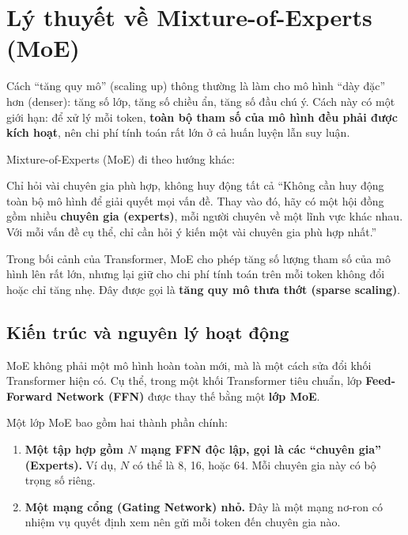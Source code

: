 
\section{Lý thuyết về Mixture-of-Experts (MoE)}
\label{sec:mixture_of_experts}

Cách “tăng quy mô” (scaling up) thông thường là làm cho mô hình “dày đặc” hơn (denser): tăng số lớp, tăng số chiều ẩn, tăng số đầu chú ý. Cách này có một giới hạn: để xử lý mỗi token, \textbf{toàn bộ tham số của mô hình đều phải được kích hoạt}, nên chi phí tính toán rất lớn ở cả huấn luyện lẫn suy luận.

Mixture-of-Experts (MoE) \cite{shazeer2017outrageously, fedus2022switch} đi theo hướng khác:

\begin{keyidea}{Chỉ hỏi vài chuyên gia phù hợp, không huy động tất cả}
“Không cần huy động toàn bộ mô hình để giải quyết mọi vấn đề. Thay vào đó, hãy có một hội đồng gồm nhiều \textbf{chuyên gia (experts)}, mỗi người chuyên về một lĩnh vực khác nhau. Với mỗi vấn đề cụ thể, chỉ cần hỏi ý kiến một vài chuyên gia phù hợp nhất.”
\end{keyidea}

Trong bối cảnh của Transformer, MoE cho phép tăng số lượng tham số của mô hình lên rất lớn, nhưng lại giữ cho chi phí tính toán trên mỗi token không đổi hoặc chỉ tăng nhẹ. Đây được gọi là \textbf{tăng quy mô thưa thớt (sparse scaling)}.

\subsection{Kiến trúc và nguyên lý hoạt động}
\label{ssec:moe_architecture}

MoE không phải một mô hình hoàn toàn mới, mà là một cách sửa đổi khối Transformer hiện có. Cụ thể, trong một khối Transformer tiêu chuẩn, lớp \textbf{Feed-Forward Network (FFN)} được thay thế bằng một \textbf{lớp MoE}.

Một lớp MoE bao gồm hai thành phần chính:
\begin{enumerate}
    \item \textbf{Một tập hợp gồm $N$ mạng FFN độc lập, gọi là các “chuyên gia” (Experts).} Ví dụ, $N$ có thể là 8, 16, hoặc 64. Mỗi chuyên gia này có bộ trọng số riêng.
    \item \textbf{Một mạng cổng (Gating Network) nhỏ.} Đây là một mạng nơ-ron có nhiệm vụ quyết định xem nên gửi mỗi token đến chuyên gia nào.
\end{enumerate}

